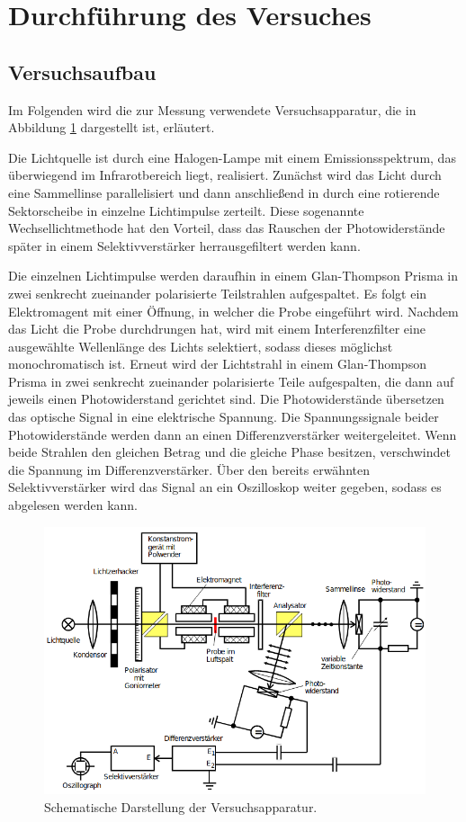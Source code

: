 \section{Durchführung des Versuches}
\label{sec:Durchführung}
\subsection{Versuchsaufbau}
Im Folgenden wird die zur Messung verwendete Versuchsapparatur, die in Abbildung \ref{fig:apparatur} dargestellt ist, erläutert.

\noindent
Die Lichtquelle ist durch eine Halogen-Lampe mit einem Emissionsspektrum, das überwiegend im Infrarotbereich liegt, realisiert. 
Zunächst wird das Licht durch eine Sammellinse parallelisiert und dann anschließend in durch eine rotierende Sektorscheibe in 
einzelne Lichtimpulse zerteilt. 
Diese sogenannte Wechsellichtmethode hat den Vorteil, dass das Rauschen der Photowiderstände später in einem Selektivverstärker
herrausgefiltert werden kann.

\noindent
Die einzelnen Lichtimpulse werden daraufhin in einem Glan-Thompson Prisma in zwei senkrecht 
zueinander polarisierte Teilstrahlen aufgespaltet. Es folgt ein Elektromagent mit einer Öffnung, in welcher die Probe eingeführt
wird. Nachdem das Licht die Probe durchdrungen hat, wird mit einem Interferenzfilter eine ausgewählte Wellenlänge des Lichts 
selektiert, sodass dieses möglichst monochromatisch ist. Erneut wird der Lichtstrahl in einem Glan-Thompson Prisma in zwei 
senkrecht zueinander polarisierte Teile aufgespalten, die dann auf jeweils einen Photowiderstand gerichtet sind. Die Photowiderstände
übersetzen das optische Signal in eine elektrische Spannung. Die Spannungssignale beider Photowiderstände werden dann an einen
Differenzverstärker weitergeleitet. Wenn beide Strahlen den gleichen Betrag und die gleiche Phase besitzen, verschwindet die Spannung
im Differenzverstärker. Über den bereits erwähnten Selektivverstärker wird das Signal an ein Oszilloskop weiter gegeben, sodass
es abgelesen werden kann.   

\begin{figure}[H]
    \centering
    \includegraphics[scale=0.7]{pictures/Versuchsaufbau.png}
    \caption{Schematische Darstellung der Versuchsapparatur. \cite{Versuchsbeschreibung}}
    \label{fig:apparatur}
\end{figure}

